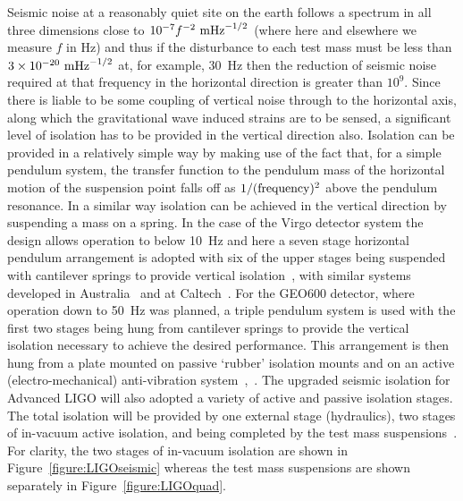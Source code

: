 \documentclass{article}
\begin{document}
Seismic noise at a reasonably quiet site on the earth follows a spectrum in all
three dimensions close to $10^{-7}f^{-2}~{\rm m}{\rm Hz}^{-1/2}$ (where here
and elsewhere we measure $f$ in Hz) and thus if the disturbance to each test
mass must be less than $3 \times 10^{-20}~{\rm m}{\rm Hz}^{-1/2}$ at, for
example, 30~Hz then the reduction of seismic noise required at that frequency in
the horizontal direction is greater than $10^{9}$. Since there is liable to be
some coupling of vertical noise through to the horizontal axis, along which the
gravitational wave induced strains are to be sensed, a significant level of
isolation has to be provided in the vertical direction also. Isolation can be
provided in a relatively simple way by making use of the fact that, for a simple
pendulum system, the transfer function to the pendulum mass of the horizontal
motion of the suspension point falls off as $1/({\rm frequency})^2$ above the
pendulum resonance. In a similar way isolation can be achieved in the vertical
direction by suspending a mass on a spring. In the case of the Virgo detector
system the design allows operation to below 10~Hz and here a seven stage
horizontal pendulum arrangement is adopted with six of the upper stages being
suspended with cantilever springs to provide vertical isolation~\cite{Braccini},
with similar systems developed in Australia~\cite{Ju1} and at
Caltech~\cite{DeSalvo}. For the GEO600 detector, where operation down to 50~Hz
was planned, a triple pendulum system is used with the first two stages being
hung from cantilever springs to provide the vertical isolation necessary to
achieve the desired performance. This arrangement is then hung from a plate
mounted on passive `rubber' isolation mounts and on an active
(electro-mechanical) anti-vibration system~\cite{Plissi1},~\cite{Torrie}. The
upgraded seismic isolation for Advanced LIGO will also adopted a variety of
active and passive isolation stages. The total isolation will be provided by one
external stage (hydraulics), two stages of in-vacuum active isolation, and being
completed by the test mass suspensions~\cite{Abbott:2002, Harry:2010}. For
clarity, the two stages of in-vacuum isolation are shown in
Figure~\ref{figure:LIGOseismic} whereas the test mass suspensions are shown
separately in Figure~\ref{figure:LIGOquad}.

\end{document}
